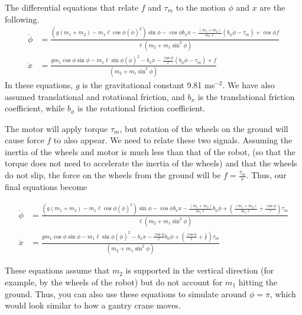 The differential equations that relate $f$ and $\tau_{m}$ to the motion $\phi$ and $x$ are the following.
\begin{equation}
\begin{aligned}
\ddot{\phi}&= \frac{(g(m_{1}+m_{2})-m_{1}\ell\cos\phi(\dot{\phi})^2) \sin\phi -  \cos{\phi}b_{x}\dot{x}   -  \frac{(m_{1}+m_{2})}{m_{1}\ell}\left(b_{\phi}\dot{\phi} - \tau_{m}\right)  + \cos{\phi}f}{\ell\left(m_{2} +m_{1}\sin^{2}\phi\right)} \\
\ddot{x} &= \frac{gm_{1}\cos\phi\sin\phi - m_{1}\ell\sin\phi(\dot{\phi})^2 -b_{x}\dot{x} - \frac{\cos\phi}{\ell}\left(b_{\phi}\dot{\phi}-\tau_{m}\right) + f}{(m_{2} + m_{1}\sin^2\phi)}
\end{aligned}
\end{equation}
In these equations, $g$ is the gravitational constant 9.81 ms$^{-2}$. We have also assumed translational and rotational friction, and $b_{x}$ is the translational friction coefficient, while $b_{\phi}$ is the rotational friction coefficient. 

The motor will apply torque $\tau_{m}$, but rotation of the wheels on the ground will cause force $f$ to also appear. We need to relate these two signals. Assuming the inertia of the wheels and motor is much less than that of the robot, (so that the torque does not need to accelerate the inertia of the wheels) and that the wheels do not slip, the force on the wheels from the ground will be $f = \frac{\tau_{m}}{r}$. Thus, our final equations become

\begin{equation}\label{eqn:model}
\begin{aligned}
\ddot{\phi}&= \frac{(g(m_{1}+m_{2})-m_{1}\ell\cos\phi(\dot{\phi})^2) \sin\phi -  \cos{\phi}b_{x}\dot{x}   -  \frac{(m_{1}+m_{2})}{m_{1}\ell}b_{\phi}\dot{\phi}  + \left( \frac{(m_{1}+m_{2})}{m_{1}\ell}+ \frac{\cos{\phi}}{r}\right)\tau_{m}}{\ell\left(m_{2} +m_{1}\sin^{2}\phi\right)} \\
\ddot{x} &= \frac{gm_{1}\cos\phi\sin\phi - m_{1}\ell\sin\phi(\dot{\phi})^2 -b_{x}\dot{x} - \frac{\cos\phi}{\ell}b_{\phi}\dot{\phi} +\left( \frac{\cos\phi}{\ell} + \frac{1}{r} \right)\tau_{m}}{(m_{2} + m_{1}\sin^2\phi)}
\end{aligned}
\end{equation}

These equations assume that $m_{2}$ is supported in the vertical direction (for example, by the wheels of the robot) but do not account for $m_{1}$ hitting the ground. Thus, you can also use these equations to simulate around $\phi = \pi$, which would look similar to how a gantry crane moves. 

